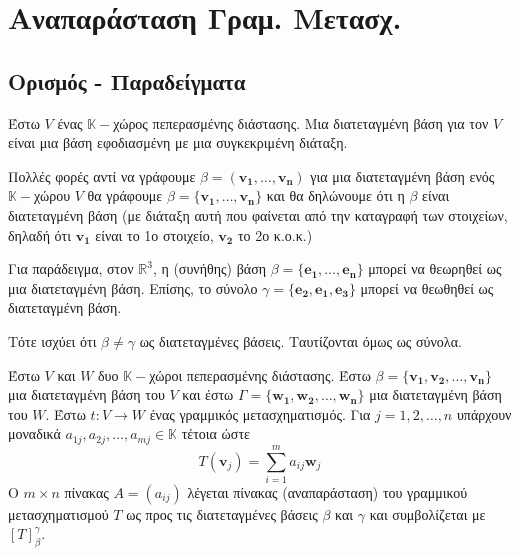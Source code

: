 



\pagestyle{vangelis}








\chapter{Αναπαράσταση Γραμ. Μετασχ.}

\section{Ορισμός - Παραδείγματα}

\begin{dfn}
  Έστω  $V$  ένας  $ \mathbb{K}- $χώρος πεπερασμένης διάστασης. Μια
  \textcolor{Col1}{διατεταγμένη βάση} για τον $V$ είναι μια βάση εφοδιασμένη με μια 
  συγκεκριμένη διάταξη.
\end{dfn}

\begin{rem}
  Πολλές φορές αντί να γράφουμε $ \beta = (\mathbf{v_{1}}, \ldots, \mathbf{v_{n}}) $ για 
  μια διατεταγμένη βάση ενός $ \mathbb{K}- $χώρου $V$ θα γράφουμε 
  $ \beta = \{ \mathbf{v_{1}}, \ldots, \mathbf{v_{n}} \} $ και θα δηλώνουμε ότι η 
  $ \beta $ είναι διατεταγμένη βάση (με διάταξη αυτή που φαίνεται από την καταγραφή 
  των στοιχείων, δηλαδή ότι $ \mathbf{v_{1}} $ είναι το 1ο στοιχείο, 
  $ \mathbf{v_{2}} $ το 2ο κ.ο.κ.) 
\end{rem}

Για παράδειγμα, στον $ \mathbb{R}^{3} $, η (συνήθης) βάση $ \beta = \{ \mathbf{e_{1}}, 
\ldots, \mathbf{e_{n}}\} $ μπορεί να θεωρηθεί ως μια διατεταγμένη βάση. 
Επίσης, το σύνολο $ \gamma = \{ \mathbf{e_{2}}, \mathbf{e_{1}}, \mathbf{e_{3}} \} $ 
μπορεί να θεωθηθεί ως διατεταγμένη βάση. 

Τότε ισχύει ότι $ \beta \neq \gamma $ ως διατεταγμένες βάσεις. 
Ταυτίζονται όμως ως σύνολα.  
\begin{dfn}
  Έστω $V$ και $W$ δυο $ \mathbb{K}- $χώροι πεπερασμένης διάστασης. Έστω $ \beta = \{
  \mathbf{v_{1}}, \mathbf{v_{2}}, \ldots, \mathbf{v_{n}} \} $ μια διατεταγμένη βάση 
  του $V$ και έστω $ \Gamma = \{ \mathbf{w_{1}}, \mathbf{w_{2}}, \ldots, 
  \mathbf{w_{n}} \} $ μια διατεταγμένη βάση του $W$. Έστω $ t \colon V \to W $ ένας 
  γραμμικός μετασχηματισμός. Για $ j = 1,2, \ldots, n $ υπάρχουν μοναδικά $ a_{1j}, 
  a_{2j}, \ldots, a_{mj} \in \mathbb{K} $ τέτοια ώστε 
  \[
    T(\mathbf{v}_{j}) = \sum_{i=1}^{m} a_{ij} \mathbf{w}_{j}  
  \] 
  Ο $ m \times n $ πίνακας $A = (a_{ij}) $ λέγεται πίνακας 
  (\textcolor{Col1}{αναπαράσταση}) του γραμμικού μετασχηματισμού $T$ ως προς τις 
  διατεταγμένες βάσεις $ \beta $ και 
  $ \gamma $ και συμβολίζεται με $ [T]_{\beta}^{\gamma} $.
\end{dfn}

